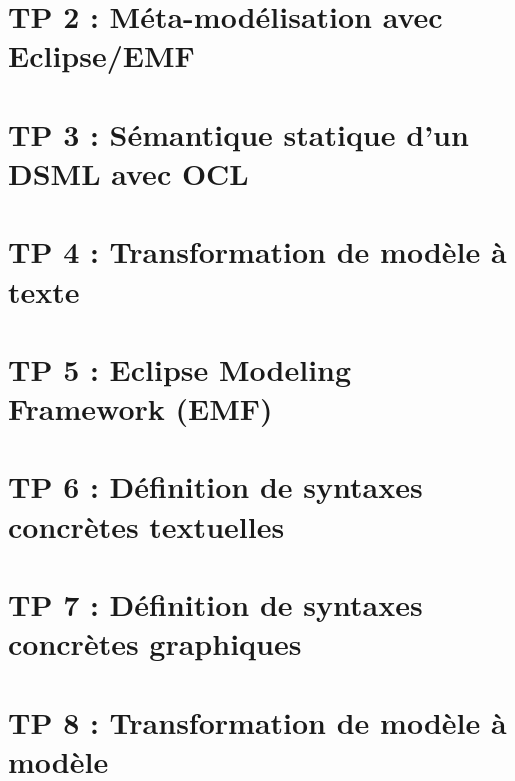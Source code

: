 \documentclass{rapport_gls}
\begin{document}


\newpage

\tableofcontents

\newpage

\chapter{TP 2 : Méta-modélisation avec Eclipse/EMF}

\chapter{TP 3 : Sémantique statique d'un DSML avec OCL}

\chapter{TP 4 : Transformation de modèle à texte}

\chapter{TP 5 : Eclipse Modeling Framework (EMF)}
%
\chapter{TP 6 : Définition de syntaxes concrètes textuelles}
%
\chapter{TP 7 : Définition de syntaxes concrètes graphiques}
%
\chapter{TP 8 : Transformation de modèle à modèle}
%
\end{document}
